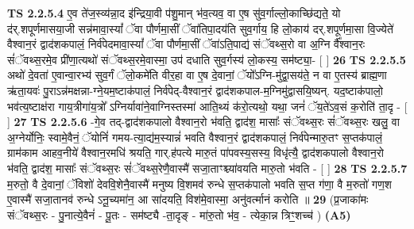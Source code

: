 \documentclass[17pt]{extarticle}
\begin{document}
                  \newline
                                \textbf{ TS 2.2.5.4} \newline
                  ए॒व ते॑ज॒स्व्य॑न्ना॒द इ॑न्द्रिया॒वी प॑शु॒मान् भ॑व॒त्यव॒ वा ए॒ष सु॑व॒र्गाल्लो॒काच्छि॑द्यते॒ यो द॑र्.शपूर्णमासया॒जी सन्न॑मावा॒स्यां᳚ ॅवा पौर्णमा॒सीं ॅवा॑तिपा॒दय॑ति सुव॒र्गाय॒ हि लो॒काय॑ दर्.शपूर्णमा॒सा वि॒ज्येते॑ वैश्वान॒रं द्वाद॑शकपालं॒ निर्व॑पेदमावा॒स्यां᳚ ॅवा पौर्णमा॒सीं ॅवा॑ऽति॒पाद्य॑ संॅवथ्स॒रो वा अ॒ग्नि र्वै᳚श्वान॒रः सं॑ॅवथ्स॒रमे॒व प्री॑णा॒त्यथो॑ संॅवथ्स॒रमे॒वास्मा॒ उप॑ दधाति सुव॒र्गस्य॑ लो॒कस्य॒ सम॑ष्ट्या॒-  [  ] \textbf{  26} \newline
                  \newline
                                \textbf{ TS 2.2.5.5} \newline
                  अथो॑ दे॒वता॑ ए॒वान्वा॒रभ्य॑ सुव॒र्गं ॅलो॒कमे॑ति वीर॒हा वा ए॒ष दे॒वानां॒ ॅयो᳚ऽग्नि-मु॑द्वा॒सय॑ते॒ न वा ए॒तस्य॑ ब्राह्म॒णा ऋ॑ता॒यवः॑ पु॒राऽन्न॑मक्षन्ना-ग्ने॒यम॒ष्टाक॑पालं॒ निर्व॑पेद्-वैश्वान॒रं द्वाद॑शकपाल-म॒ग्निमु॑द्वासयि॒ष्यन्. यद॒ष्टाक॑पालो॒ भव॑त्य॒ष्टाक्ष॑रा गाय॒त्रीगा॑य॒त्रो᳚ ऽग्निर्यावा॑ने॒वाग्निस्तस्मा॑ आति॒थ्यं क॑रो॒त्यथो॒ यथा॒ जनं॑ ॅय॒ते॑ऽव॒सं क॒रोति॑ ता॒दृ - [  ] \textbf{  27} \newline
                  \newline
                                \textbf{ TS 2.2.5.6} \newline
                  -गे॒व तद्-द्वाद॑शकपालो वैश्वान॒रो भ॑वति॒ द्वाद॑श॒ मासाः᳚ संॅवथ्स॒रः सं॑ॅवथ्स॒रः खलु॒ वा अ॒ग्नेर्योनिः॒ स्वामे॒वैनं॒ ॅयोनिं॑ गमय-त्या॒द्य॑म॒स्यान्नं॑ भवति वैश्वान॒रं द्वाद॑शकपालं॒ निर्व॑पेन्मारु॒तꣳ स॒प्तक॑पालं॒ ग्राम॑काम आहव॒नीये॑ वैश्वान॒रमधि॑ श्रयति॒ गार्.ह॑पत्ये मारु॒तं पा॑पवस्य॒सस्य॒ विधृ॑त्यै॒ द्वाद॑शकपालो वैश्वान॒रो भ॑वति॒ द्वाद॑श॒ मासाः᳚ संॅवथ्स॒रः सं॑ॅवथ्स॒रेणै॒वास्मै॑ सजा॒ताꣳश्च्या॑वयति मारु॒तो भ॑वति - [  ] \textbf{  28} \newline
                  \newline
                                \textbf{ TS 2.2.5.7} \newline
                  म॒रुतो॒ वै दे॒वानां॒ ॅविशो॑ देववि॒शेनै॒वास्मै॑ मनुष्य वि॒शमव॑ रुन्धे स॒प्तक॑पालो भवति स॒प्त ग॑णा॒ वै म॒रुतो॑ गण॒श ए॒वास्मै॑ सजा॒तानव॑ रुन्धे ऽनू॒च्यमा॑न॒ आ सा॑दयति॒ विश॑मे॒वास्मा॒ अनु॑वर्त्मानं करोति ॥ \textbf{  29} \newline
                  \newline
                      (प्र॒जाका॑मः संॅवथ्स॒रः - पु॒नात्ये॒वैनं॑ - पू॒तः - सम॑ष्ट्यै -ता॒दृङ् - मा॑रु॒तो भ॑व॒ - त्येका॒न्न त्रिꣳ॒॒शच्च॑ )  \textbf{(A5)} \newline \newline
\end{document}
